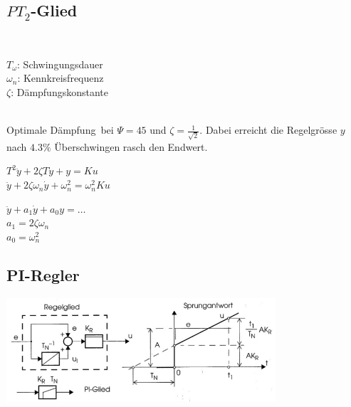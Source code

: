 	\subsection{$PT_2$-Glied }
		\begin{minipage}{5cm}
        \\
        \end{minipage}
		\begin{minipage}{13cm}
        $T_\omega$: Schwingungsdauer\\
        $\omega_n$: Kennkreisfrequenz\\
        $\zeta$: \hspace{1.1mm} Dämpfungskonstante\\
        \end{minipage}\\
		\glqq Optimale Dämpfung\grqq\ bei $\Psi=45$ und $\zeta=\frac{1}{\sqrt{2}}$.
		Dabei erreicht die Regelgrösse $y$ nach $4.3\%$ Überschwingen rasch den
		Endwert.\\
		\begin{minipage}{7cm}
		$T^2\ddot{y}+2\zeta T \dot{y}+ y=Ku$\\
		$\ddot{y}+2\zeta\omega_n\dot{y}+\omega_n^2=\omega_n^2 Ku$
		\end{minipage}
		\begin{minipage}{11cm}
        $\ddot{y}+a_1\dot{y}+a_0 y=\ldots$\\
        $a_1=2\zeta\omega_n$\\
        $a_0=\omega_n^2$
        \end{minipage}
	
	\subsection{PI-Regler }
		\begin{minipage}{15cm}
        \includegraphics[angle={0},width=10cm]{./bilder/PI_Regler.jpg}
        \end{minipage}\\ \\
		\begin{minipage}{15cm}
        \qquad
        \end{minipage}
		
